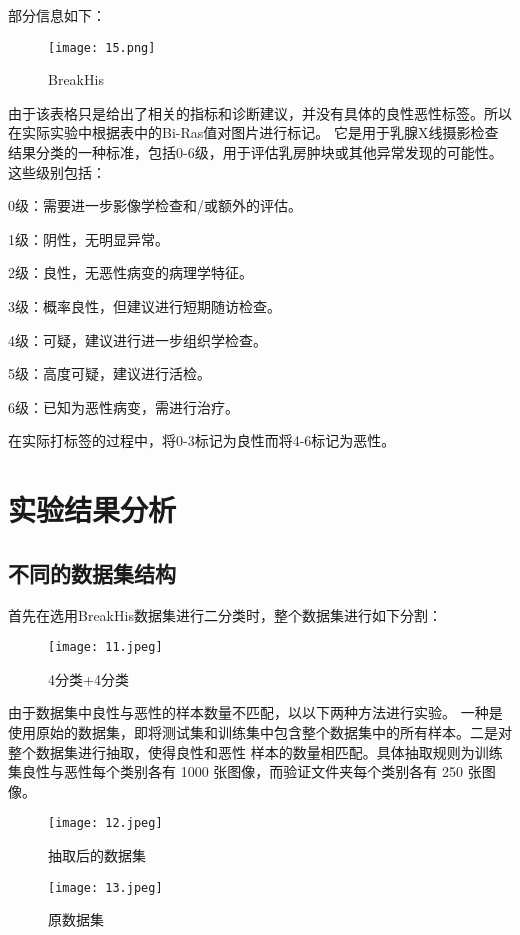 \documentclass[AutoFakeBold]{LZUThesis}
\begin{document}
部分信息如下：
\begin{figure}[H]
    \centering
    \texttt{[image: 15.png]}
    \caption{BreakHis}
    \label{figure}
 \end{figure}
  
 由于该表格只是给出了相关的指标和诊断建议，并没有具体的良性恶性标签。所以在实际实验中根据表中的Bi-Ras值对图片进行标记。
 它是用于乳腺X线摄影检查结果分类的一种标准，包括0-6级，用于评估乳房肿块或其他异常发现的可能性。这些级别包括：

 0级：需要进一步影像学检查和/或额外的评估。

 1级：阴性，无明显异常。

 2级：良性，无恶性病变的病理学特征。

 3级：概率良性，但建议进行短期随访检查。

 4级：可疑，建议进行进一步组织学检查。

 5级：高度可疑，建议进行活检。

 6级：已知为恶性病变，需进行治疗。


 在实际打标签的过程中，将0-3标记为良性而将4-6标记为恶性。

 

\section{实验结果分析}
\subsection{不同的数据集结构}
首先在选用BreakHis数据集进行二分类时，整个数据集进行如下分割：
\begin{figure}[H]
    \centering
    \texttt{[image: 11.jpeg]}
    \caption{4分类+4分类}
    \label{figure}
 \end{figure}

由于数据集中良性与恶性的样本数量不匹配，以以下两种方法进行实验。
一种是使用原始的数据集，即将测试集和训练集中包含整个数据集中的所有样本。二是对整个数据集进行抽取，使得良性和恶性
样本的数量相匹配。具体抽取规则为训练集良性与恶性每个类别各有 1000 张图像，而验证文件夹每个类别各有 250 张图像。

\begin{figure}[H]
    \centering
    \texttt{[image: 12.jpeg]}
    \caption{抽取后的数据集}
    \label{figure}
 \end{figure}


 \begin{figure}[H]
    \centering
    \texttt{[image: 13.jpeg]}
    \caption{原数据集}
    \label{figure}
 \end{figure}
\end{document}
